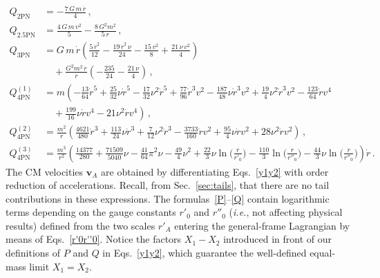\documentclass[prd,preprint,superscriptaddress,tightenlines,nofootinbib,
  eqsecnum,showpacs]{revtex4}
\begin{document}
\begin{subequations}\label{Q}
\begin{align}
Q_\text{2PN} &= -\frac{7\,G\,m\,\dot{r}}{4}\,,\\
Q_\text{2.5PN} &= \frac{4\,G\,m\,v^2}{5}
  -\frac{8\,G^2m^2}{5\,r} \,,\\ 
Q_\text{3PN} &= G\,m\,\dot{r}\left( \frac{5\,\dot{r}^2}{12} -
\frac{19\,\dot{r}^2\,\nu}{24} - \frac{15\,v^2}{8} +
\frac{21\,\nu\,v^2}{4} \right) \nonumber\\ & \quad +
\frac{G^2m^2\,\dot{r}}{r}\left( -\frac{235}{24}- \frac{21\,\nu}{4}
\right) \,,\\
Q^{(1)}_\text{4PN} &= m \left(- \frac{13}{64} \dot{r}^5
 + \frac{25}{32} \nu \dot{r}^5
 -  \frac{17}{32} \nu^2 \dot{r}^5
 + \frac{77}{96} \dot{r}^3 v^{2}
 -  \frac{187}{48} \nu \dot{r}^3 v^{2}
 + \frac{19}{4} \nu^2 \dot{r}^3 v^{2}
 -  \frac{123}{64} \dot{r} v^{4}\right.\nonumber\\
&\left.\quad + \frac{199}{16} \nu \dot{r} v^{4}
 - 21 \nu^2 \dot{r} v^{4}\right)
 \,,\\
Q^{(2)}_\text{4PN} &= \frac{m^2}{r} \left(\frac{4621}{480} \dot{r}^3
 + \frac{113}{24} \nu \dot{r}^3
 + \frac{7}{12} \nu^2 \dot{r}^3
 -  \frac{3733}{160} \dot{r} v^{2}
 + \frac{95}{4} \nu \dot{r} v^{2}
 + 28 \nu^2 \dot{r} v^{2}\right)
 \,,\\
Q^{(3)}_\text{4PN} &= \frac{m^3}{r^2} \left(\frac{14377}{280}
 + \frac{71509}{5040} \nu
 -  \frac{41}{64} \pi^2 \nu
 -  \frac{49}{4} \nu^2
 + \frac{22}{3} \nu \ln\Big(\frac{r}{r'_{0}}\Big)
 -  \frac{110}{3} \ln\Big(\frac{r}{r''_{0}}\Big)
 -  \frac{44}{3} \nu \ln\Big(\frac{r}{r''_{0}}\Big)\right) \dot{r}
 \,.
\end{align}\end{subequations}
%
The CM velocities $\bm{v}_A$ are obtained by differentiating Eqs.~\eqref{y1y2}
with order reduction of accelerations. Recall, from Sec.~\ref{sec:tails}, that
there are no tail contributions in these expressions. The
formulas~\eqref{P}--\eqref{Q} contain logarithmic terms depending on the gauge
constants $r'_0$ and $r''_0$ (\textit{i.e.}, not affecting physical results)
defined from the two scales $r'_A$ entering the general-frame Lagrangian by
means of Eqs.~\eqref{r'0r''0}. Notice the factors $X_{1}-X_{2}$ introduced in front of our definitions of $P$ and $Q$ in Eqs.~\eqref{y1y2}, which guarantee the well-defined equal-mass limit $X_{1}=X_{2}$.

%

\end{document}
